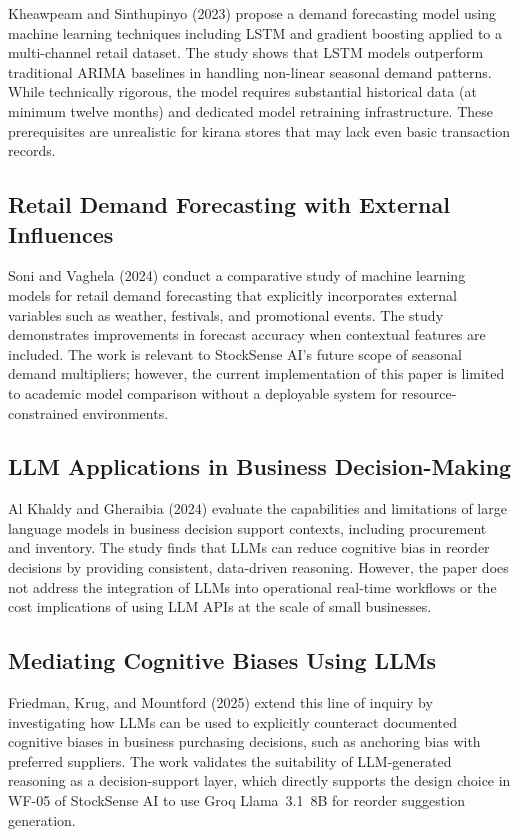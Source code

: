 Kheawpeam and Sinthupinyo (2023) \cite{kheawpeam2023} propose a demand forecasting model using
machine learning techniques including LSTM and gradient boosting applied to a multi-channel
retail dataset. The study shows that LSTM models outperform traditional ARIMA baselines in
handling non-linear seasonal demand patterns. While technically rigorous, the model requires
substantial historical data (at minimum twelve months) and dedicated model retraining
infrastructure. These prerequisites are unrealistic for kirana stores that may lack even basic
transaction records.

\subsection{Retail Demand Forecasting with External Influences}

Soni and Vaghela (2024) \cite{soni2024} conduct a comparative study of machine learning models
for retail demand forecasting that explicitly incorporates external variables such as weather,
festivals, and promotional events. The study demonstrates improvements in forecast accuracy
when contextual features are included. The work is relevant to StockSense AI's future scope
of seasonal demand multipliers; however, the current implementation of this paper is limited
to academic model comparison without a deployable system for resource-constrained environments.

\subsection{LLM Applications in Business Decision-Making}

Al Khaldy and Gheraibia (2024) \cite{alkhaldy2024} evaluate the capabilities and limitations of
large language models in business decision support contexts, including procurement and inventory.
The study finds that LLMs can reduce cognitive bias in reorder decisions by providing consistent,
data-driven reasoning. However, the paper does not address the integration of LLMs into
operational real-time workflows or the cost implications of using LLM APIs at the scale of
small businesses.

\subsection{Mediating Cognitive Biases Using LLMs}

Friedman, Krug, and Mountford (2025) \cite{friedman2025} extend this line of inquiry by
investigating how LLMs can be used to explicitly counteract documented cognitive biases in
business purchasing decisions, such as anchoring bias with preferred suppliers. The work
validates the suitability of LLM-generated reasoning as a decision-support layer, which directly
supports the design choice in WF-05 of StockSense AI to use Groq Llama~3.1~8B for reorder
suggestion generation.

